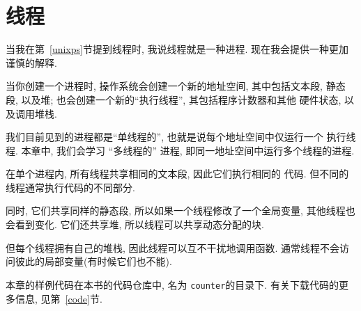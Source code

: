 \documentclass[12pt]{book}
\begin{document}
{\chapter{线程}

当我在第~\ref{unixps}节提到线程时, 我说线程就是一种进程. 
现在我会提供一种更加谨慎的解释.

当你创建一个进程时, 操作系统会创建一个新的地址空间, 其中包括文本段, 
静态段, 以及堆; 也会创建一个新的``执行线程'', 其包括程序计数器和其他
硬件状态, 以及调用堆栈. 

我们目前见到的进程都是``单线程的'', 也就是说每个地址空间中仅运行一个
执行线程. 本章中, 我们会学习 ``多线程的'' 进程, 即同一地址空间中运行多个线程的进程.   

在单个进程内, 所有线程共享相同的文本段, 因此它们执行相同的
代码. 但不同的线程通常执行代码的不同部分. 

同时, 它们共享同样的静态段, 所以如果一个线程修改了一个全局变量, 
其他线程也会看到变化. 它们还共享堆, 所以线程可以共享动态分配的块. 


但每个线程拥有自己的堆栈, 因此线程可以互不干扰地调用函数. 
通常线程不会访问彼此的局部变量(有时候它们也不能).

本章的样例代码在本书的代码仓库中, 名为 {\tt counter}的目录下. 
有关下载代码的更多信息, 见第~\ref{code}节.

}
\end{document}
